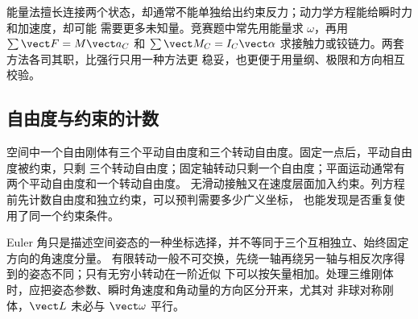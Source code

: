 能量法擅长连接两个状态，却通常不能单独给出约束反力；动力学方程能给瞬时力和加速度，却可能
需要更多未知量。竞赛题中常先用能量求 $\omega$，再用 $\sum\vect F=M\vect a_C$ 和
$\sum\vect M_C=I_C\vect\alpha$ 求接触力或铰链力。两套方法各司其职，比强行只用一种方法更
稳妥，也更便于用量纲、极限和方向相互校验。

\subsection*{自由度与约束的计数}

空间中一个自由刚体有三个平动自由度和三个转动自由度。固定一点后，平动自由度被约束，只剩
三个转动自由度；固定轴转动只剩一个自由度；平面运动通常有两个平动自由度和一个转动自由度。
无滑动接触又在速度层面加入约束。列方程前先计数自由度和独立约束，可以预判需要多少广义坐标，
也能发现是否重复使用了同一个约束条件。

Euler 角只是描述空间姿态的一种坐标选择，并不等同于三个互相独立、始终固定方向的角速度分量。
有限转动一般不可交换，先绕一轴再绕另一轴与相反次序得到的姿态不同；只有无穷小转动在一阶近似
下可以按矢量相加。处理三维刚体时，应把姿态参数、瞬时角速度和角动量的方向区分开来，尤其对
非球对称刚体，$\vect L$ 未必与 $\vect\omega$ 平行。
